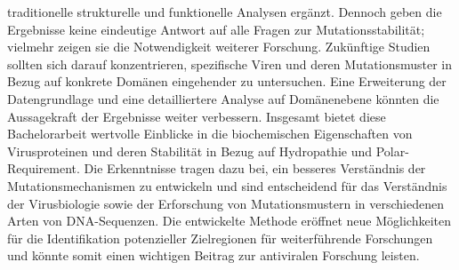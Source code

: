 \documentclass[german,version-2022-01]{uzl-thesis}
\begin{document}
traditionelle strukturelle und funktionelle Analysen erg\"anzt. Dennoch geben die Ergebnisse keine eindeutige Antwort auf alle Fragen zur Mutationsstabilit\"at; vielmehr zeigen sie die Notwendigkeit weiterer Forschung. Zuk\"unftige Studien sollten sich darauf konzentrieren, spezifische Viren und deren Mutationsmuster in Bezug auf konkrete Dom\"anen eingehender zu untersuchen. Eine Erweiterung der Datengrundlage und eine detailliertere Analyse auf Dom\"anenebene k\"onnten die Aussagekraft der Ergebnisse weiter verbessern. Insgesamt bietet diese Bachelorarbeit wertvolle Einblicke in die biochemischen Eigenschaften von Virusproteinen und deren Stabilit\"at in Bezug auf Hydropathie und Polar-Requirement. Die Erkenntnisse tragen dazu bei, ein besseres Verst\"andnis der Mutationsmechanismen zu entwickeln und sind entscheidend f\"ur das Verst\"andnis der Virusbiologie sowie der Erforschung von Mutationsmustern in verschiedenen Arten von DNA-Sequenzen. Die entwickelte Methode er\"offnet neue M\"oglichkeiten f\"ur die Identifikation potenzieller Zielregionen f\"ur weiterf\"uhrende Forschungen und k\"onnte somit einen wichtigen Beitrag zur antiviralen Forschung leisten.




%
\end{document}
